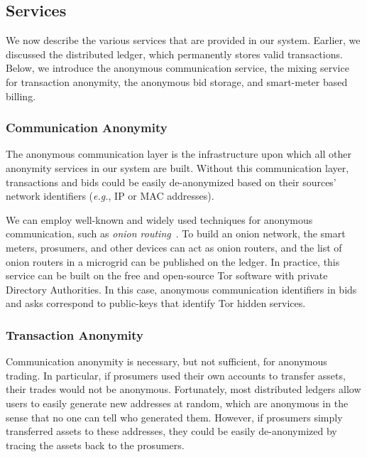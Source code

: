 \subsection{Services}

We now describe the various services that are provided in our system.
Earlier, we discussed the distributed ledger, which permanently stores
valid transactions.  Below, we introduce the anonymous communication
service, the mixing service for transaction anonymity, the anonymous
bid storage, and smart-meter based billing.

\subsubsection{Communication Anonymity}
The anonymous communication layer is the infrastructure upon which all
other anonymity services in our system are built.  Without this communication
layer, transactions and bids could be easily de-anonymized based on
their sources' network identifiers (\emph{e.g.}, IP or MAC addresses).

We can employ well-known and widely used techniques for anonymous
communication, such as \emph{onion routing}~\cite{reed1998anonymous}.
To build an onion network, the smart meters, prosumers, and other
devices can act as onion routers, and the list of onion routers in a
microgrid can be published on the ledger.  In practice, this service 
can be built on 
the free and open-source Tor software with private Directory
Authorities.  In this case, anonymous communication identifiers in
bids and asks correspond to public-keys that identify Tor hidden
services.

\subsubsection{Transaction Anonymity}
Communication anonymity is necessary, but not sufficient, for
anonymous trading. In particular, if prosumers used their own accounts
to transfer assets, their trades would not be anonymous.  Fortunately,
most distributed ledgers allow users to easily generate new addresses
at random, which are anonymous in the sense that no one can tell who
generated them.  However, if prosumers simply transferred assets to these
addresses, they could be easily de-anonymized by tracing the
assets back to the prosumers.

